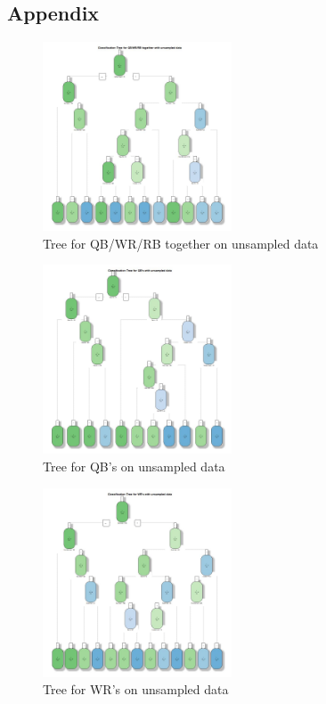 \documentclass[]{article}
\begin{document}
\hypertarget{appendix}{%
\subsection{Appendix}\label{appendix}}

\newpage

\begin{figure}
\hypertarget{id}{%
\centering
\includegraphics[width=0.5\textwidth,height=\textheight]{../../Project_Scripts/TogethertreeNS.jpg}
\caption{Tree for QB/WR/RB together on unsampled data}\label{id}
}
\end{figure}

\begin{figure}
\hypertarget{id}{%
\centering
\includegraphics[width=0.5\textwidth,height=\textheight]{../../Project_Scripts/QBtreeNS.jpg}
\caption{Tree for QB's on unsampled data}\label{id}
}
\end{figure}

\begin{figure}
\hypertarget{id}{%
\centering
\includegraphics[width=0.5\textwidth,height=\textheight]{../../Project_Scripts/WRtreeNS.jpg}
\caption{Tree for WR's on unsampled data}\label{id}
}
\end{figure}
\end{document}
